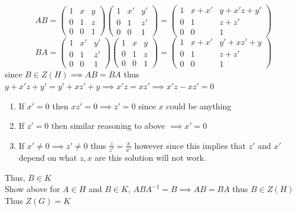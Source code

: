 \documentclass[12pt, letterpaper]{article}
\theoremstyle{definition}
\begin{document}
    \[
    AB = \begin{pmatrix}
    1 & x & y \\
    0 & 1 & z \\
    0 & 0 & 1
    \end{pmatrix}
    \begin{pmatrix}
    1 & x' & y' \\
    0 & 1 & z' \\
    0 & 0 & 1
    \end{pmatrix}
    = \begin{pmatrix}
    1 & x + x' & y + x'z + y' \\
    0 & 1 & z + z' \\
    0 & 0 & 1
    \end{pmatrix}
    \]
    \[
    BA = \begin{pmatrix}
    1 & x' & y' \\
    0 & 1 & z' \\
    0 & 0 & 1
    \end{pmatrix}
    \begin{pmatrix}
    1 & x & y \\
    0 & 1 & z \\
    0 & 0 & 1
    \end{pmatrix}
    = \begin{pmatrix}
    1 & x + x' & y' + xz' + y \\
    0 & 1 & z + z' \\
    0 & 0 & 1
    \end{pmatrix}
    \]
    since $B \in Z(H) \implies AB=BA$ thus $y+x'z+y'=y'+xz'+y \implies x'z=xz' \implies x'z-xz'=0$
    \begin{enumerate}
        \item If $x' = 0$ then $xz'=0 \implies z'=0$ since $x$ could be anything
        \item If $z'=0$ then similar reasoning to above $ \implies x'=0$
        \item If $x' \neq 0 \implies z' \neq 0$ thus $\frac{z}{z'}=\frac{x}{x'}$ however since this implies that $z'$ and $x'$ depend on what $z,x$ are this solution will not work.
    \end{enumerate}
    Thus, $B \in K$\\
    Show above for $A \in H$ and $B \in K$, $ABA^{-1}=B \implies AB=BA$ thus $B \in Z(H)$\\
    Thus $Z(G)=K$
\end{document}
